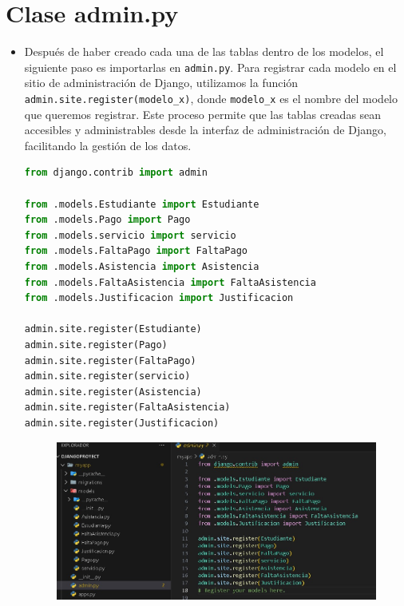 \documentclass{article}
\begin{document}
		
	
\section{Clase admin.py}
\begin{itemize}
    \item Después de haber creado cada una de las tablas dentro de los modelos, el siguiente paso es importarlas en \texttt{admin.py}. Para registrar cada modelo en el sitio de administración de Django, utilizamos la función \texttt{admin.site.register(modelo\_x)}, donde \texttt{modelo\_x} es el nombre del modelo que queremos registrar. Este proceso permite que las tablas creadas sean accesibles y administrables desde la interfaz de administración de Django, facilitando la gestión de los datos.

    \begin{itemize}
        \begin{lstlisting}[language=Python, caption={Código dentro del admin.py}]
from django.contrib import admin

from .models.Estudiante import Estudiante
from .models.Pago import Pago
from .models.servicio import servicio
from .models.FaltaPago import FaltaPago
from .models.Asistencia import Asistencia
from .models.FaltaAsistencia import FaltaAsistencia
from .models.Justificacion import Justificacion

admin.site.register(Estudiante)
admin.site.register(Pago)
admin.site.register(FaltaPago)
admin.site.register(servicio)
admin.site.register(Asistencia)
admin.site.register(FaltaAsistencia)
admin.site.register(Justificacion)
        \end{lstlisting}

        \begin{figure}[H]
            \centering
            \includegraphics[scale=0.5]{img/admin.jpeg}
        \end{figure}
    \end{itemize}
\end{itemize}
\end{document}
